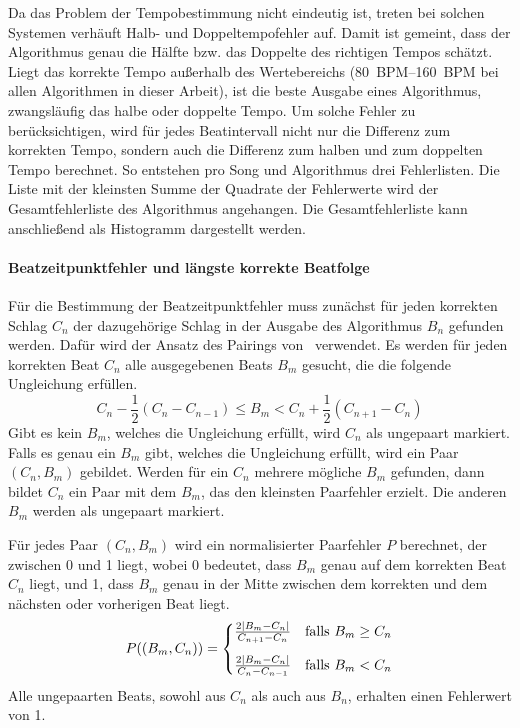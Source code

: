 {{{			%
			Da das Problem der Tempobestimmung nicht eindeutig ist,
				treten bei solchen Systemen verhäuft Halb- und Doppeltempofehler auf.
			Damit ist gemeint,
				dass der Algorithmus genau die Hälfte bzw. das Doppelte des richtigen Tempos schätzt.
			Liegt das korrekte Tempo au{\ss}erhalb des Wertebereichs
				(\SIrange{80}{160}{\ac{BPM}} bei allen Algorithmen in dieser Arbeit),
				ist die beste Ausgabe eines Algorithmus,
				zwangsläufig das halbe oder doppelte Tempo.
			Um solche Fehler zu berücksichtigen,
				wird für jedes Beatintervall nicht nur die Differenz zum korrekten Tempo,
				sondern auch die Differenz zum halben und zum doppelten Tempo berechnet.
			So entstehen pro Song und Algorithmus drei Fehlerlisten.
			Die Liste mit der kleinsten Summe der Quadrate der Fehlerwerte wird der Gesamtfehlerliste des Algorithmus angehangen.
			Die Gesamtfehlerliste kann anschlie{\ss}end als Histogramm dargestellt werden.
		}

		\paragraph{Beatzeitpunktfehler und längste korrekte Beatfolge}
		{
			Für die Bestimmung der Beatzeitpunktfehler muss zunächst
				für jeden korrekten Schlag $C_n$ der dazugehörige Schlag in der Ausgabe des Algorithmus $B_n$ gefunden werden.
			Dafür wird der Ansatz des Pairings von~\cite{1997_GoMu1} verwendet.
			Es werden für jeden korrekten Beat $C_n$ alle ausgegebenen Beats $B_m$ gesucht,
				die die folgende Ungleichung erfüllen.
			\begin{equation}
				C_n - \frac{1}{2}(C_n - C_{n - 1}) \le B_m < C_n + \frac{1}{2}(C_{n + 1} - C_n)
			\end{equation}
			Gibt es kein $B_m$,
				welches die Ungleichung erfüllt,
				wird $C_n$ als ungepaart markiert.
			Falls es genau ein $B_m$ gibt,
				welches die Ungleichung erfüllt,
				wird ein Paar $(C_n, B_m)$ gebildet.
			Werden für ein $C_n$ mehrere mögliche $B_m$ gefunden,
				dann bildet $C_n$ ein Paar mit dem $B_m$,
				das den kleinsten Paarfehler erzielt.
			Die anderen $B_m$ werden als ungepaart markiert.

			Für jedes Paar $(C_n, B_m)$ wird ein normalisierter Paarfehler $P$ berechnet,
				der zwischen \num{0} und \num{1} liegt,
				wobei \num{0} bedeutet,
				dass $B_m$ genau auf dem korrekten Beat $C_n$ liegt,
				und \num{1},
				dass $B_m$ genau in der Mitte zwischen dem korrekten und dem nächsten oder vorherigen Beat liegt.
			\begin{equation}
				P((B_m, C_n)) =
					\begin{cases}
						\frac{2|B_m - C_n|}{C_{n + 1} - C_n} & \text{falls } B_m \ge C_n \vspace{3mm} \\
						\frac{2|B_m - C_n|}{C_n - C_{n - 1}} & \text{falls } B_m  <  C_n
					\end{cases}
			\end{equation}
			Alle ungepaarten Beats,
				sowohl aus $C_n$ als auch aus $B_n$,
				erhalten einen Fehlerwert von \num{1}.

}}}
